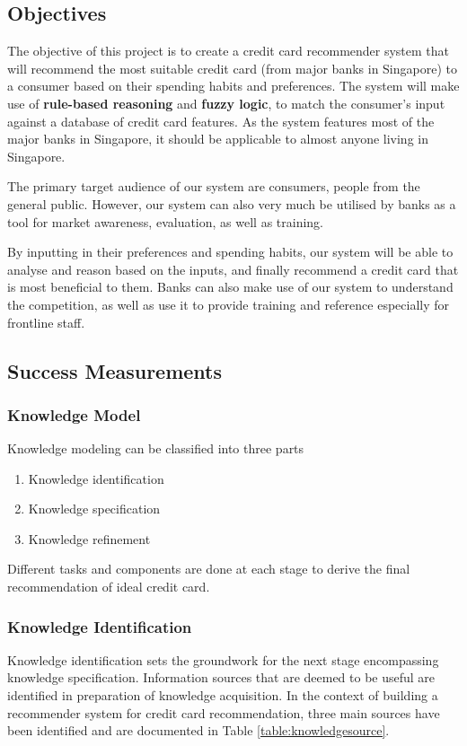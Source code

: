 \subsection{Objectives} %
\label{sub:objectives}
	The objective of this project is to create a credit card recommender system that will recommend the most suitable credit card (from major banks in Singapore) to a consumer based on their spending habits and preferences. The system will make use of \textbf{rule-based reasoning} and \textbf{fuzzy logic}, to match the consumer’s input against a database of credit card features. As the system features most of the major banks in Singapore, it should be applicable to almost anyone living in Singapore.

	The primary target audience of our system are consumers, people from the general public. However, our system can also very much be utilised by banks as a tool for market awareness, evaluation, as well as training.

	By inputting in their preferences and spending habits, our system will be able to analyse and reason based on the inputs, and finally recommend a credit card that is most beneficial to them. Banks can also make use of our system to understand the competition, as well as use it to provide training and reference especially for frontline staff.

\subsection{Success Measurements} %
\label{sub:success_measurements}

	\subsubsection{Knowledge Model} %
	\label{ssub:knowledge_model}
		Knowledge modeling can be classified into three parts \cite{schreiber2001knowledge}
		\begin{enumerate}[label=(\roman*)]
			\item Knowledge identification
			\item Knowledge specification
			\item Knowledge refinement
		\end{enumerate}
		Different tasks and components are done at each stage to derive the final recommendation of ideal credit card.

	\subsubsection{Knowledge Identification} %
	\label{ssub:knowledge_identification}
		Knowledge identification sets the groundwork for the next stage encompassing knowledge specification. Information sources that are deemed to be useful are identified in preparation of knowledge acquisition. In the context of building a recommender system for credit card recommendation, three main sources have been identified and are documented in Table \ref{table:knowledgesource}.

